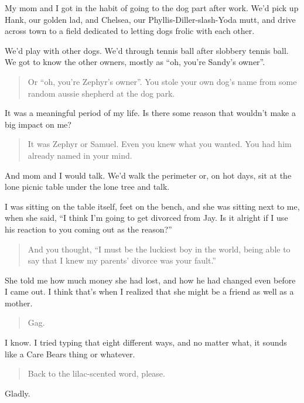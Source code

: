 My mom and I got in the habit of going to the dog part after work. We'd pick up Hank, our golden lad, and Chelsea, our Phyllis-Diller-slash-Yoda mutt, and drive across town to a field dedicated to letting dogs frolic with each other.

We'd play with other dogs. We'd through tennis ball after slobbery tennis ball. We got to know the other owners, mostly as ``oh, you're Sandy's owner''.

\begin{quote}
Or ``oh, you're Zephyr's owner''. You stole your own dog's name from some random aussie shepherd at the dog park.
\end{quote}

It was a meaningful period of my life. Is there some reason that wouldn't make a big impact on me?

\begin{quote}
It was Zephyr or Samuel. Even you knew what you wanted. You had him already named in your mind.
\end{quote}

And mom and I would talk. We'd walk the perimeter or, on hot days, sit at the lone picnic table under the lone tree and talk.

I was sitting on the table itself, feet on the bench, and she was sitting next to me, when she said, ``I think I'm going to get divorced from Jay. Is it alright if I use his reaction to you coming out as the reason?''

\begin{quote}
And you thought, ``I must be the luckiest boy in the world, being able to say that I knew my parents' divorce was your fault.''
\end{quote}

She told me how much money she had lost, and how he had changed even before I came out. I think that's when I realized that she might be a friend as well as a mother.

\begin{quote}
Gag.
\end{quote}

I know. I tried typing that eight different ways, and no matter what, it sounds like a Care Bears thing or whatever.

\begin{quote}
Back to the lilac-scented word, please.
\end{quote}

Gladly.
